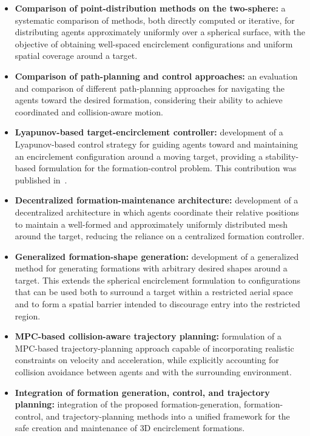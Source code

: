 \begin{itemize}
\item \textbf{Comparison of point-distribution methods on the two-sphere:} a systematic comparison of methods, both directly computed or iterative, for distributing agents approximately uniformly over a spherical surface, with the objective of obtaining well-spaced encirclement configurations and uniform spatial coverage around a target.

\item \textbf{Comparison of path-planning and control approaches:} an evaluation and comparison of different path-planning approaches for navigating the agents toward the desired formation, considering their ability to achieve coordinated and collision-aware motion.

\item \textbf{Lyapunov-based target-encirclement controller:} development of a Lyapunov-based control strategy for guiding agents toward and maintaining an encirclement configuration around a moving target, providing a stability-based formulation for the formation-control problem. This contribution was published in~\cite{cavalheiroHierarchicalNonlinearControl2026}.

\item \textbf{Decentralized formation-maintenance architecture:} development of a decentralized architecture in which agents coordinate their relative positions to maintain a well-formed and approximately uniformly distributed mesh around the target, reducing the reliance on a centralized formation controller.

\item \textbf{Generalized formation-shape generation:} development of a generalized method for generating formations with arbitrary desired shapes around a target. This extends the spherical encirclement formulation to configurations that can be used both to surround a target within a restricted aerial space and to form a spatial barrier intended to discourage entry into the restricted region.

\item \textbf{\gls{MPC}-based collision-aware trajectory planning:} formulation of a \gls{MPC}-based trajectory-planning approach capable of incorporating realistic constraints on velocity and acceleration, while explicitly accounting for collision avoidance between agents and with the surrounding environment.

\item \textbf{Integration of formation generation, control, and trajectory planning:} integration of the proposed formation-generation, formation-control, and trajectory-planning methods into a unified framework for the safe creation and maintenance of \gls{3D} encirclement formations.

\end{itemize}

